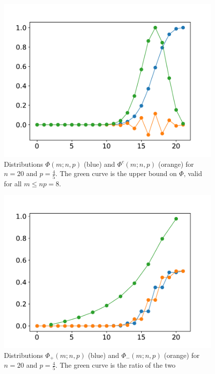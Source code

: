 \documentclass[pra,
aps,
twocolumn,
superscriptaddress,
groupedaddress,
nofootinbib,
reprint
]{revtex4-1}
\begin{document}
\begin{figure}
    \centering
    \includegraphics[scale=0.5]{figs/Phi.pdf}
    \caption{Distributions $\Phi(m;n,p)$ (blue) and $\Phi^c(m;n,p)$ (orange) for $n=20$ and $p=\frac{4}{5}$.
    The green curve is the upper bound on $\Phi$, valid for all $m \leq np = 8$.
    }
    \label{fig:Phi}
\end{figure}

\begin{figure}
    \centering
    \includegraphics[scale=0.5]{figs/Phi_ratio.pdf}
    \caption{Distributions $\Phi_+(m;n,p)$ (blue) and $\Phi_-(m;n,p)$ (orange) for $n=20$ and $p=\frac{4}{5}$.
    The green curve is the ratio of the two
    }
    \label{fig:Phi_ratio}
\end{figure}
\end{document}

